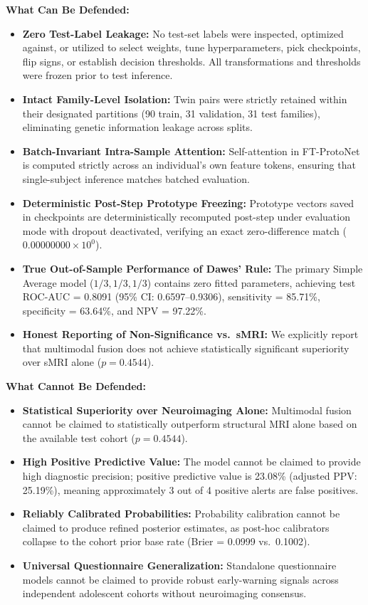 \documentclass[10pt,letterpaper]{article}
\begin{document}
\textbf{What Can Be Defended:}
\begin{itemize}
    \item \textbf{Zero Test-Label Leakage:} No test-set labels were inspected, optimized against, or utilized to select weights, tune hyperparameters, pick checkpoints, flip signs, or establish decision thresholds. All transformations and thresholds were frozen prior to test inference.
    \item \textbf{Intact Family-Level Isolation:} Twin pairs were strictly retained within their designated partitions (90 train, 31 validation, 31 test families), eliminating genetic information leakage across splits.
    \item \textbf{Batch-Invariant Intra-Sample Attention:} Self-attention in FT-ProtoNet is computed strictly across an individual's own feature tokens, ensuring that single-subject inference matches batched evaluation.
    \item \textbf{Deterministic Post-Step Prototype Freezing:} Prototype vectors saved in checkpoints are deterministically recomputed post-step under evaluation mode with dropout deactivated, verifying an exact zero-difference match ($0.00000000\times 10^0$).
    \item \textbf{True Out-of-Sample Performance of Dawes' Rule:} The primary Simple Average model ($1/3, 1/3, 1/3$) contains zero fitted parameters, achieving test ROC-AUC = 0.8091 (95\% CI: 0.6597--0.9306), sensitivity = 85.71\%, specificity = 63.64\%, and NPV = 97.22\%.
    \item \textbf{Honest Reporting of Non-Significance vs.\ sMRI:} We explicitly report that multimodal fusion does not achieve statistically significant superiority over sMRI alone ($p = 0.4544$).
\end{itemize}

\textbf{What Cannot Be Defended:}
\begin{itemize}
    \item \textbf{Statistical Superiority over Neuroimaging Alone:} Multimodal fusion cannot be claimed to statistically outperform structural MRI alone based on the available test cohort ($p = 0.4544$).
    \item \textbf{High Positive Predictive Value:} The model cannot be claimed to provide high diagnostic precision; positive predictive value is 23.08\% (adjusted PPV: 25.19\%), meaning approximately 3 out of 4 positive alerts are false positives.
    \item \textbf{Reliably Calibrated Probabilities:} Probability calibration cannot be claimed to produce refined posterior estimates, as post-hoc calibrators collapse to the cohort prior base rate (Brier = 0.0999 vs.\ 0.1002).
    \item \textbf{Universal Questionnaire Generalization:} Standalone questionnaire models cannot be claimed to provide robust early-warning signals across independent adolescent cohorts without neuroimaging consensus.
\end{itemize}
\end{document}
